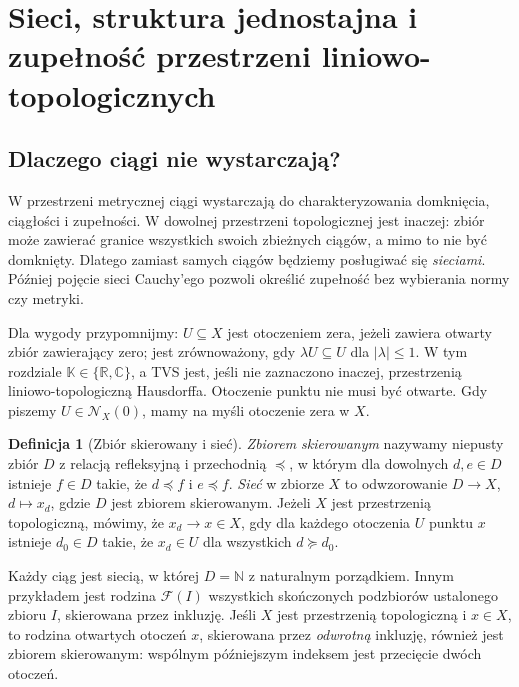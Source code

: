 \documentclass[11pt,a4paper]{article}
\numberwithin{equation}{section}
\theoremstyle{plain}
\theoremstyle{definition}
\newtheorem{definicja}[twierdzenie]{Definicja}
\theoremstyle{remark}
\newcommand{\R}{\mathbb R}
\newcommand{\C}{\mathbb C}
\newcommand{\N}{\mathbb N}
\newcommand{\K}{\mathbb K}
\begin{document}
\bigskip
\setcounter{section}{2}
\section{Sieci, struktura jednostajna i zupełność przestrzeni liniowo-topologicznych}\label{sec:zupelnosc}

\subsection{Dlaczego ciągi nie wystarczają?}

W przestrzeni metrycznej ciągi wystarczają do charakteryzowania domknięcia,
ciągłości i zupełności. W dowolnej przestrzeni topologicznej jest inaczej:
zbiór może zawierać granice wszystkich swoich zbieżnych ciągów, a mimo to
nie być domknięty. Dlatego zamiast samych ciągów będziemy posługiwać się
\emph{sieciami}. Później pojęcie sieci Cauchy'ego pozwoli określić
zupełność bez wybierania normy czy metryki.

Dla wygody przypomnijmy: $U\subseteq X$ jest otoczeniem
zera, jeżeli zawiera otwarty zbiór zawierający zero;
jest zrównoważony, gdy $\lambda U\subseteq U$
dla $|\lambda|\leq1$.
W tym rozdziale $\K\in\{\R,\C\}$, a TVS jest, jeśli nie zaznaczono
inaczej, przestrzenią liniowo-topologiczną Hausdorffa. Otoczenie punktu
nie musi być otwarte. Gdy piszemy $U\in\mathcal N_X(0)$, mamy na myśli
otoczenie zera w $X$.

\begin{definicja}[Zbiór skierowany i sieć]\label{def:net}
\emph{Zbiorem skierowanym} nazywamy niepusty zbiór $D$ z relacją
refleksyjną i przechodnią $\preceq$, w którym dla dowolnych $d,e\in D$
istnieje $f\in D$ takie, że $d\preceq f$ i $e\preceq f$.
\emph{Sieć} w zbiorze $X$ to odwzorowanie $D\to X$,
$d\mapsto x_d$, gdzie $D$ jest zbiorem skierowanym.
Jeżeli $X$ jest przestrzenią topologiczną, mówimy, że $x_d\to x\in X$,
gdy dla każdego otoczenia $U$ punktu $x$ istnieje $d_0\in D$ takie,
że $x_d\in U$ dla wszystkich $d\succeq d_0$.
\end{definicja}

Każdy ciąg jest siecią, w której $D=\N$ z naturalnym porządkiem.
Innym przykładem jest rodzina $\mathcal F(I)$ wszystkich skończonych
podzbiorów ustalonego zbioru $I$, skierowana przez inkluzję.
Jeśli $X$ jest przestrzenią topologiczną i $x\in X$, to rodzina
otwartych otoczeń $x$, skierowana przez \emph{odwrotną} inkluzję,
również jest zbiorem skierowanym: wspólnym późniejszym indeksem
jest przecięcie dwóch otoczeń.
\end{document}

